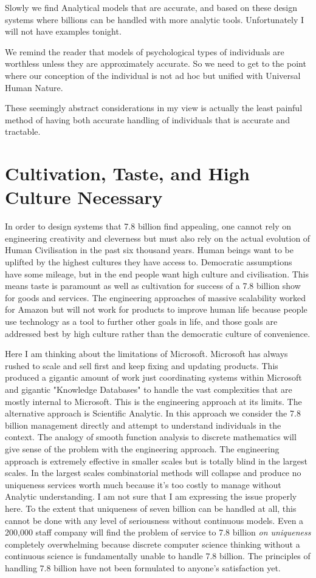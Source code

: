 \documentclass{amsart}
\begin{document}
Slowly we find Analytical models that are accurate, and based on these design systems where billions can be handled with more analytic tools.  Unfortunately I will not have examples tonight.  

We remind the reader that models of psychological types of individuals are worthless unless they are approximately accurate.  So we need to get to the point where our conception of the individual is not ad hoc but unified with Universal Human Nature.

These seemingly abstract considerations in my view is actually the least painful method of having both accurate handling of individuals that is accurate and tractable.  

\section{Cultivation, Taste, and High Culture Necessary}

In order to design systems that 7.8 billion find appealing, one cannot rely on engineering creativity and cleverness but must also rely on the actual evolution of Human Civilisation in the past six thousand years.  Human beings want to be uplifted by the highest cultures they have access to.  Democratic assumptions have some mileage, but in the end people want high culture and civilisation.  This means taste is paramount as well as cultivation for success of a 7.8 billion show for goods and services.  The engineering approaches of massive scalability worked for Amazon but will not work for products to improve human life because people use technology as a tool to further other goals in life, and those goals are addressed best by high culture rather than the democratic culture of convenience.

Here I am thinking about the limitations of Microsoft.  Microsoft has always rushed to scale and sell first and keep fixing and updating products.  This produced a gigantic amount of work just coordinating systems within Microsoft and gigantic "Knowledge Databases" to handle the vast complexities that are mostly internal to Microsoft.  This is the engineering approach at its limits.  The alternative approach is Scientific Analytic.  In this approach we consider the 7.8 billion management directly and attempt to understand individuals in the context.  The analogy of smooth function analysis to discrete mathematics will give sense of the problem with the engineering approach.  The engineering approach is extremely effective in smaller scales but is totally blind in the largest scales.  In the largest scales combinatorial methods will collapse and produce no uniqueness services worth much because it's too costly to manage without Analytic understanding.  I am not sure that I am expressing the issue properly here.  To the extent that uniqueness of seven billion can be handled at all, this cannot be done with any level of seriousness without continuous models.  Even a 200,000 staff company will find the problem of service to 7.8 billion {\em on uniqueness} completely overwhelming because discrete computer science thinking without a continuous science is fundamentally unable to handle 7.8 billion.  The principles of handling 7.8 billion have not been formulated to anyone's satisfaction yet.
\end{document}
